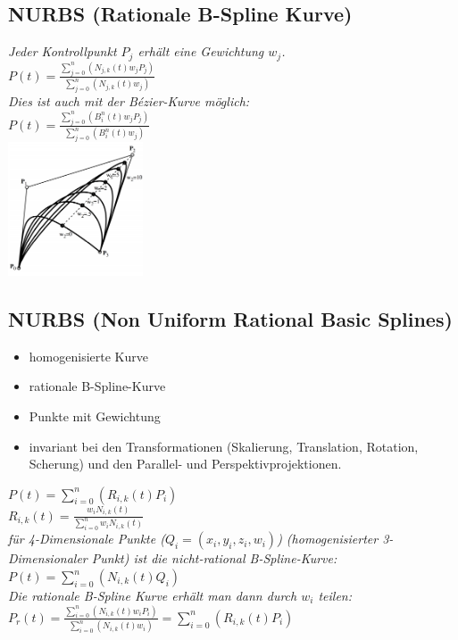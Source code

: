 \subsection{NURBS (Rationale B-Spline Kurve)}

\textit{Jeder Kontrollpunkt $P_j$ erhält eine Gewichtung $w_j$.}\\

$P(t) = \frac{\sum^n_{j=0}(N_{j,k}(t)w_jP_j)}{\sum^n_{j=0}(N_{j,k}(t)w_j)}$\\

\textit{Dies ist auch mit der Bézier-Kurve möglich:}\\
$P(t) = \frac{\sum^n_{j=0}(B_i^n(t)w_jP_j)}{\sum^n_{j=0}(B_i^n(t)w_j)}$\\

\includegraphics[width=0.3\textwidth]{assets/curves-weigths.png}

\subsection{NURBS (Non Uniform Rational Basic Splines)}

\begin{itemize}
    \item homogenisierte Kurve
    \item rationale B-Spline-Kurve
    \item Punkte mit Gewichtung
    \item invariant bei den Transformationen (Skalierung, Translation, Rotation, Scherung) und
    den Parallel- und Perspektivprojektionen.
\end{itemize}

$\displaystyle P(t) = \sum^n_{i=0}(R_{i,k}(t)P_i)$\\

$R_{i,k}(t) = \frac{w_iN_{i,k}(t)}{\sum^n_{i=0}w_iN_{i,k}(t)}$\\

\textit{für 4-Dimensionale Punkte ($Q_i = (x_i, y_i, z_i, w_i)$) (homogenisierter 3-Dimensionaler Punkt)
ist die nicht-rational B-Spline-Kurve:}\\

$\displaystyle P(t) = \sum^n_{i=0}(N_{i,k}(t)Q_i)$\\

\textit{Die rationale B-Spline Kurve erhält man dann durch $w_i$ teilen:}\\

$P_r(t) = \frac{\sum^n_{i=0}(N_{i,k}(t)w_iP_i)}{\sum^n_{i=0}(N_{i,k}(t)w_i)} = \sum^n_{i=0}(R_{i,k}(t)P_i)$